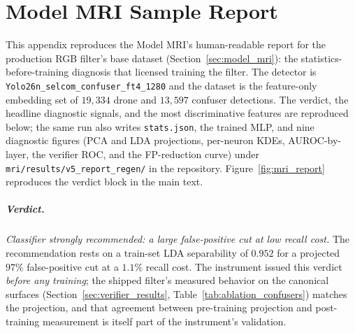 \chapter{Model MRI Sample Report}
\label{app:mri_report}

This appendix reproduces the Model MRI's human-readable report for the production RGB filter's base dataset (Section~\ref{sec:model_mri}): the statistics-before-training diagnosis that licensed training the filter. The detector is \texttt{Yolo26n\_selcom\_confuser\_ft4\_1280} and the dataset is the feature-only embedding set of $19{,}334$ drone and $13{,}597$ confuser detections. The verdict, the headline diagnostic signals, and the most discriminative features are reproduced below; the same run also writes \texttt{stats.json}, the trained MLP, and nine diagnostic figures (PCA and LDA projections, per-neuron KDEs, AUROC-by-layer, the verifier ROC, and the FP-reduction curve) under \texttt{mri/results/\allowbreak v5\_report\_regen/} in the repository. Figure~\ref{fig:mri_report} reproduces the verdict block in the main text.

\paragraph{Verdict.} \emph{Classifier strongly recommended: a large false-positive cut at low recall cost.} The recommendation rests on a train-set LDA separability of $0.952$ for a projected $97\%$ false-positive cut at a $1.1\%$ recall cost. The instrument issued this verdict \emph{before any training}; the shipped filter's measured behavior on the canonical surfaces (Section~\ref{sec:verifier_results}, Table~\ref{tab:ablation_confusers}) matches the projection, and that agreement between pre-training projection and post-training measurement is itself part of the instrument's validation.

